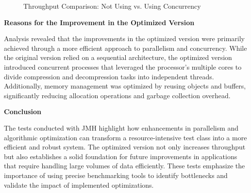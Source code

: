 \documentclass[sigconf]{acmart}
\begin{document}
\begin{figure}[h]
    \centering
    \caption{Throughput Comparison: Not Using vs. Using Concurrency}
    \label{fig:throughput_comparison}
\end{figure}

\textbf{Reasons for the Improvement in the Optimized Version}

Analysis revealed that the improvements in the optimized version were primarily achieved through a more efficient approach to parallelism and concurrency. While the original version relied on a sequential architecture, the optimized version introduced concurrent processes that leveraged the processor's multiple cores to divide compression and decompression tasks into independent threads. Additionally, memory management was optimized by reusing objects and buffers, significantly reducing allocation operations and garbage collection overhead.

\textbf{Conclusion}

The tests conducted with JMH highlight how enhancements in parallelism and algorithmic optimization can transform a resource-intensive test class into a more efficient and robust system. The optimized version not only increases throughput but also establishes a solid foundation for future improvements in applications that require handling large volumes of data efficiently. These tests emphasize the importance of using precise benchmarking tools to identify bottlenecks and validate the impact of implemented optimizations.
\end{document}

